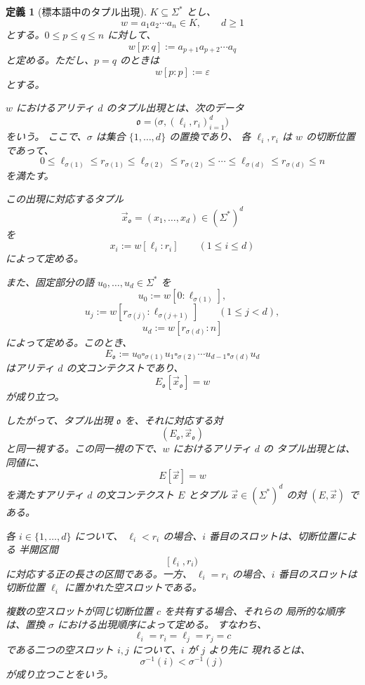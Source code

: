 \documentclass[11pt,a4paper]{ltjsarticle}
\newtheorem{definition}[theorem]{定義}
\theoremstyle{remark}
\newcommand{\tuple}[1]{\vec{#1}}
\newcommand{\blank}{\square}
\newcommand{\eps}{\varepsilon}
\begin{document}
\begin{definition}[標本語中のタプル出現]
\label{def:tuple-occurrence}
\(K\subseteq\Sigma^*\) とし、
\[
  w=a_1a_2\cdots a_n\in K,
  \qquad
  d\ge 1
\]
とする。\(0\le p\le q\le n\) に対して、
\[
  w[p:q]:=a_{p+1}a_{p+2}\cdots a_q
\]
と定める。ただし、\(p=q\) のときは
\[
  w[p:p]:=\eps
\]
とする。

\(w\) における\emph{アリティ \(d\) のタプル出現}とは、次のデータ
\[
  \mathfrak{o}
  =
  \bigl(
    \sigma,(\ell_i,r_i)_{i=1}^d
  \bigr)
\]
をいう。
ここで、\(\sigma\) は集合 \(\{1,\ldots,d\}\) の置換であり、
各 \(\ell_i,r_i\) は \(w\) の切断位置であって、
\[
  0
  \le
  \ell_{\sigma(1)}
  \le
  r_{\sigma(1)}
  \le
  \ell_{\sigma(2)}
  \le
  r_{\sigma(2)}
  \le
  \cdots
  \le
  \ell_{\sigma(d)}
  \le
  r_{\sigma(d)}
  \le
  n
\]
を満たす。

この出現に対応するタプル
\[
  \tuple x_{\mathfrak{o}}
  =
  (x_1,\ldots,x_d)
  \in(\Sigma^*)^d
\]
を
\[
  x_i:=w[\ell_i:r_i]
  \qquad
  (1\le i\le d)
\]
によって定める。

また、固定部分の語
\(u_0,\ldots,u_d\in\Sigma^*\) を
\[
  u_0:=w[0:\ell_{\sigma(1)}],
\]
\[
  u_j
  :=
  w[r_{\sigma(j)}:\ell_{\sigma(j+1)}]
  \qquad
  (1\le j<d),
\]
\[
  u_d:=w[r_{\sigma(d)}:n]
\]
によって定める。このとき、
\[
  E_{\mathfrak{o}}
  :=
  u_0
  \blank_{\sigma(1)}
  u_1
  \blank_{\sigma(2)}
  \cdots
  u_{d-1}
  \blank_{\sigma(d)}
  u_d
\]
はアリティ \(d\) の文コンテクストであり、
\[
  E_{\mathfrak{o}}[\tuple x_{\mathfrak{o}}]=w
\]
が成り立つ。

したがって、タプル出現 \(\mathfrak{o}\) を、それに対応する対
\[
  (E_{\mathfrak{o}},\tuple x_{\mathfrak{o}})
\]
と同一視する。この同一視の下で、\(w\) におけるアリティ \(d\) の
タプル出現とは、同値に、
\[
  E[\tuple x]=w
\]
を満たすアリティ \(d\) の文コンテクスト \(E\) とタプル
\(\tuple x\in(\Sigma^*)^d\) の対 \((E,\tuple x)\) である。

各 \(i\in\{1,\ldots,d\}\) について、
\(\ell_i<r_i\) の場合、\(i\) 番目のスロットは、切断位置による
半開区間
\[
  [\ell_i,r_i)
\]
に対応する正の長さの区間である。一方、
\(\ell_i=r_i\) の場合、\(i\) 番目のスロットは切断位置
\(\ell_i\) に置かれた空スロットである。

複数の空スロットが同じ切断位置 \(c\) を共有する場合、それらの
局所的な順序は、置換 \(\sigma\) における出現順序によって定める。
すなわち、
\[
  \ell_i=r_i=\ell_j=r_j=c
\]
である二つの空スロット \(i,j\) について、\(i\) が \(j\) より先に
現れるとは、
\[
  \sigma^{-1}(i)<\sigma^{-1}(j)
\]
が成り立つことをいう。
\end{definition}
\end{document}
